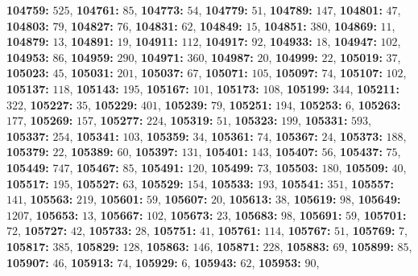 \textsf{\bfseries 104759:} $525$, \textsf{\bfseries 104761:} $85$, \textsf{\bfseries 104773:} $54$, \textsf{\bfseries 104779:} $51$, \textsf{\bfseries 104789:} $147$, \textsf{\bfseries 104801:} $47$, \textsf{\bfseries 104803:} $79$, \textsf{\bfseries 104827:} $76$, \textsf{\bfseries 104831:} $62$, \textsf{\bfseries 104849:} $15$, \textsf{\bfseries 104851:} $380$, \textsf{\bfseries 104869:} $11$, \textsf{\bfseries 104879:} $13$, \textsf{\bfseries 104891:} $19$, \textsf{\bfseries 104911:} $112$, \textsf{\bfseries 104917:} $92$, \textsf{\bfseries 104933:} $18$, \textsf{\bfseries 104947:} $102$, \textsf{\bfseries 104953:} $86$, \textsf{\bfseries 104959:} $290$, \textsf{\bfseries 104971:} $360$, \textsf{\bfseries 104987:} $20$, \textsf{\bfseries 104999:} $22$, \textsf{\bfseries 105019:} $37$, \textsf{\bfseries 105023:} $45$, \textsf{\bfseries 105031:} $201$, \textsf{\bfseries 105037:} $67$, \textsf{\bfseries 105071:} $105$, \textsf{\bfseries 105097:} $74$, \textsf{\bfseries 105107:} $102$, \textsf{\bfseries 105137:} $118$, \textsf{\bfseries 105143:} $195$, \textsf{\bfseries 105167:} $101$, \textsf{\bfseries 105173:} $108$, \textsf{\bfseries 105199:} $344$, \textsf{\bfseries 105211:} $322$, \textsf{\bfseries 105227:} $35$, \textsf{\bfseries 105229:} $401$, \textsf{\bfseries 105239:} $79$, \textsf{\bfseries 105251:} $194$, \textsf{\bfseries 105253:} $6$, \textsf{\bfseries 105263:} $177$, \textsf{\bfseries 105269:} $157$, \textsf{\bfseries 105277:} $224$, \textsf{\bfseries 105319:} $51$, \textsf{\bfseries 105323:} $199$, \textsf{\bfseries 105331:} $593$, \textsf{\bfseries 105337:} $254$, \textsf{\bfseries 105341:} $103$, \textsf{\bfseries 105359:} $34$, \textsf{\bfseries 105361:} $74$, \textsf{\bfseries 105367:} $24$, \textsf{\bfseries 105373:} $188$, \textsf{\bfseries 105379:} $22$, \textsf{\bfseries 105389:} $60$, \textsf{\bfseries 105397:} $131$, \textsf{\bfseries 105401:} $143$, \textsf{\bfseries 105407:} $56$, \textsf{\bfseries 105437:} $75$, \textsf{\bfseries 105449:} $747$, \textsf{\bfseries 105467:} $85$, \textsf{\bfseries 105491:} $120$, \textsf{\bfseries 105499:} $73$, \textsf{\bfseries 105503:} $180$, \textsf{\bfseries 105509:} $40$, \textsf{\bfseries 105517:} $195$, \textsf{\bfseries 105527:} $63$, \textsf{\bfseries 105529:} $154$, \textsf{\bfseries 105533:} $193$, \textsf{\bfseries 105541:} $351$, \textsf{\bfseries 105557:} $141$, \textsf{\bfseries 105563:} $219$, \textsf{\bfseries 105601:} $59$, \textsf{\bfseries 105607:} $20$, \textsf{\bfseries 105613:} $38$, \textsf{\bfseries 105619:} $98$, \textsf{\bfseries 105649:} $1207$, \textsf{\bfseries 105653:} $13$, \textsf{\bfseries 105667:} $102$, \textsf{\bfseries 105673:} $23$, \textsf{\bfseries 105683:} $98$, \textsf{\bfseries 105691:} $59$, \textsf{\bfseries 105701:} $72$, \textsf{\bfseries 105727:} $42$, \textsf{\bfseries 105733:} $28$, \textsf{\bfseries 105751:} $41$, \textsf{\bfseries 105761:} $114$, \textsf{\bfseries 105767:} $51$, \textsf{\bfseries 105769:} $7$, \textsf{\bfseries 105817:} $385$, \textsf{\bfseries 105829:} $128$, \textsf{\bfseries 105863:} $146$, \textsf{\bfseries 105871:} $228$, \textsf{\bfseries 105883:} $69$, \textsf{\bfseries 105899:} $85$, \textsf{\bfseries 105907:} $46$, \textsf{\bfseries 105913:} $74$, \textsf{\bfseries 105929:} $6$, \textsf{\bfseries 105943:} $62$, \textsf{\bfseries 105953:} $90$, 
